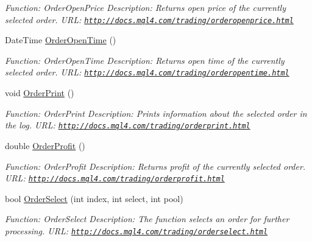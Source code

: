 \begin{DoxyCompactItemize}
\begin{DoxyCompactList}\small\item\em Function\+: Order\+Open\+Price Description\+: Returns open price of the currently selected order. U\+RL\+: \href{http://docs.mql4.com/trading/orderopenprice.html}{\tt http\+://docs.\+mql4.\+com/trading/orderopenprice.\+html} \end{DoxyCompactList}\item 
Date\+Time \hyperlink{class_m_q_l4_c_sharp_1_1_base_1_1_m_q_l_base_a7bb27accf90120bfa7dffe682df5a2dc}{Order\+Open\+Time} ()
\begin{DoxyCompactList}\small\item\em Function\+: Order\+Open\+Time Description\+: Returns open time of the currently selected order. U\+RL\+: \href{http://docs.mql4.com/trading/orderopentime.html}{\tt http\+://docs.\+mql4.\+com/trading/orderopentime.\+html} \end{DoxyCompactList}\item 
void \hyperlink{class_m_q_l4_c_sharp_1_1_base_1_1_m_q_l_base_a0d1b1bb1d6020e4e020121da6835f4df}{Order\+Print} ()
\begin{DoxyCompactList}\small\item\em Function\+: Order\+Print Description\+: Prints information about the selected order in the log. U\+RL\+: \href{http://docs.mql4.com/trading/orderprint.html}{\tt http\+://docs.\+mql4.\+com/trading/orderprint.\+html} \end{DoxyCompactList}\item 
double \hyperlink{class_m_q_l4_c_sharp_1_1_base_1_1_m_q_l_base_ae56ae49572a1203b2c188e37dc084db4}{Order\+Profit} ()
\begin{DoxyCompactList}\small\item\em Function\+: Order\+Profit Description\+: Returns profit of the currently selected order. U\+RL\+: \href{http://docs.mql4.com/trading/orderprofit.html}{\tt http\+://docs.\+mql4.\+com/trading/orderprofit.\+html} \end{DoxyCompactList}\item 
bool \hyperlink{class_m_q_l4_c_sharp_1_1_base_1_1_m_q_l_base_ab98ad6de279735375ebf7612484718ff}{Order\+Select} (int index, int select, int pool)
\begin{DoxyCompactList}\small\item\em Function\+: Order\+Select Description\+: The function selects an order for further processing. U\+RL\+: \href{http://docs.mql4.com/trading/orderselect.html}{\tt http\+://docs.\+mql4.\+com/trading/orderselect.\+html} \end{DoxyCompactList}\item 

\end{DoxyCompactItemize}
